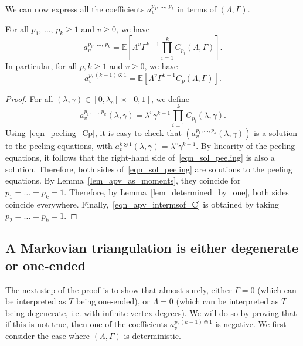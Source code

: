 \documentclass[AHL,Unicode,longabstracts,published]{cedram}
\newcommand{\E}{\mathbb{E}}
\begin{document}
We can now express all the coefficients $a_v^{p_1, \,\dots,\,p_k}$ in terms of $(\Lambda, \Gamma)$.

\begin{prop}\label{prop_sol_peeling}
For all $p_1,\,\dots,\,p_k \geq 1$ and $v \geq 0$, we have
\begin{equation}\label{eqn_sol_peeling}
a^{p_1,\,\dots,\,p_k}_v = \E \left[\Lambda^{v} \Gamma^{k-1} \prod_{i=1}^k C_{p_i}(\Lambda, \Gamma)\right].
\end{equation}
In particular, for all $p,k \geq 1$ and $v \geq 0$, we have
\begin{equation}\label{eqn_apv_intermsof_C}
a^{p, (k-1) \otimes 1}_v = \E \left[\Lambda^v \Gamma^{k-1} C_p(\Lambda, \Gamma) \right].
\end{equation}
\end{prop}

\begin{proof}
For all $(\lambda, \gamma) \in [0,\lambda_c] \times [0,1]$, we define
\[
a^{p_1,\,\dots,\,p_k}_v(\lambda, \gamma) = \lambda^{v} \gamma^{k-1} \prod_{i=1}^k C_{p_i}(\lambda, \gamma).
\]
Using~\eqref{eqn_peeling_Cp}, it is easy to check that $\left(a_v^{p_1, \dots, p_k}(\lambda, \gamma) \right)$ is a solution to the peeling equations, with $a_v^{k \otimes 1}(\lambda, \gamma)=\lambda^v \gamma^{k-1}$. By linearity of the peeling equations, it follows that the right-hand side of~\eqref{eqn_sol_peeling} is also a solution. Therefore, both sides of~\eqref{eqn_sol_peeling} are solutions to the peeling equations. By Lemma~\ref{lem_apv_as_moments}, they coincide for $p_1=\dots=p_k=1$. Therefore, by Lemma~\ref{lem_determined_by_one}, both sides coincide everywhere. Finally,~\eqref{eqn_apv_intermsof_C} is obtained by taking $p_2=\dots=p_k=1$.
\end{proof}

\subsection{A Markovian triangulation is either degenerate or one-ended}\label{subsec_degenerate_or_oneended}

The next step of the proof is to show that almost surely, either $\Gamma=0$ (which can be interpreted as $T$ being one-ended), or $\Lambda=0$ (which can be interpreted as $T$ being degenerate, i.e. with infinite vertex degrees). We will do so by proving that if this is not true, then one of the coefficients $a_v^{p,(k-1) \otimes 1}$ is negative. We first consider the case where $(\Lambda, \Gamma)$ is deterministic.
\end{document}

